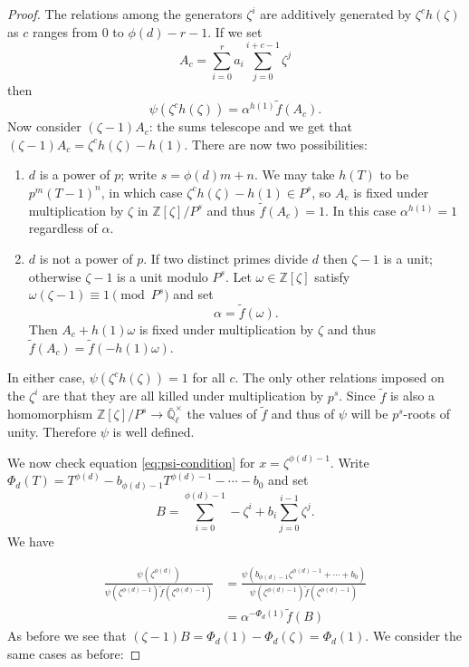 \documentclass[11pt]{amsart}
\theoremstyle{plain}
\theoremstyle{definition}
\theoremstyle{remark}
\newcommand{\ZZ}{{\mathbb{Z}}}
\newcommand{\EE}{\mathbb{\bar Q}_\ell}
\newcommand{\EEx}{\EE^\times}
\begin{document}
\begin{proof}
  The relations among the generators $\zeta^i$ are additively
  generated by $\zeta^ch(\zeta)$ as $c$ ranges from $0$ to
  $\phi(d)-r-1$.  If we set
  $$A_c = \sum_{i=0}^r a_i \sum_{j=0}^{i+c-1} \zeta^j$$
  then
  $$\psi(\zeta^ch(\zeta)) = \alpha^{h(1)} \tilde{f}(A_c).$$
  Now consider $(\zeta - 1)A_c$: the sums telescope and we get that
  $(\zeta-1)A_c = \zeta^ch(\zeta) - h(1).$ There are now two
  possibilities:
  \begin{enumerate}
  \item $d$ is a power of $p$; write $s = \phi(d)m + n$.  We may take
    $h(T)$ to be $p^m(T-1)^n$, in which case $\zeta^ch(\zeta) - h(1) \in P^s$,
    so $A_c$ is fixed under multiplication by $\zeta$ in
    $\ZZ[\zeta]/P^s$ and thus $\tilde{f}(A_c) = 1$.  In this case
    $\alpha^{h(1)} = 1$ regardless of $\alpha$.
  \item $d$ is not a power of $p$.  If two distinct primes divide $d$
    then $\zeta - 1$ is a unit; otherwise $\zeta - 1$ is a unit modulo
    $P^s$.  Let $\omega \in \ZZ[\zeta]$ satisfy
    $\omega(\zeta - 1) \equiv 1 \pmod{P^s}$ and set
    \begin{equation} \label{alpha-def}
      \alpha = \tilde{f}(\omega).
    \end{equation}
    Then $A_c + h(1)\omega$ is fixed under multiplication by $\zeta$
    and thus $\tilde{f}(A_c) = \tilde{f}(-h(1)\omega)$.
  \end{enumerate}
  In either case, $\psi(\zeta^ch(\zeta)) = 1$ for all $c$.  The only
  other relations imposed on the $\zeta^i$ are that they are all
  killed under multiplication by $p^s$.  Since $\tilde{f}$ is also a
  homomorphism $\ZZ[\zeta]/P^s \rightarrow \EEx$ the values of
  $\tilde{f}$ and thus of $\psi$ will be $p^s$-roots of unity.
  Therefore $\psi$ is well defined.

  We now check equation \ref{eq:psi-condition} for
  $x = \zeta^{\phi(d)-1}$.  Write
  $\Phi_d(T) = T^{\phi(d)} - b_{\phi(d)-1}T^{\phi(d)-1} - \cdots - b_0$
  and set
  $$B = \sum_{i=0}^{\phi(d)-1} -\zeta^i + b_i \sum_{j=0}^{i-1} \zeta^j.$$
  We have

  \begin{align*}
    \frac{\psi(\zeta^{\phi(d)})}{\psi(\zeta^{\phi(d)-1})\tilde{f}(\zeta^{\phi(d)-1})}
    &= \frac{\psi(b_{\phi(d)-1}\zeta^{\phi(d)-1} + \cdots + b_0)}{\psi(\zeta^{\phi(d)-1})\tilde{f}(\zeta^{\phi(d)-1})} \\
    &= \alpha^{-\Phi_d(1)} \tilde{f}(B)
  \end{align*}
  As before we see that $(\zeta - 1)B = \Phi_d(1) - \Phi_d(\zeta) = \Phi_d(1)$.
  We consider the same cases as before:


\end{proof}
\end{document}
